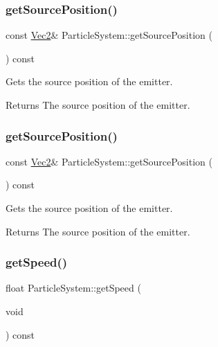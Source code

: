 \subsubsection{\texorpdfstring{get\+Source\+Position()}{getSourcePosition()}\hspace{0.1cm}{\footnotesize\ttfamily [1/2]}}
{\footnotesize\ttfamily const \hyperlink{classVec2}{Vec2}\& Particle\+System\+::get\+Source\+Position (\begin{DoxyParamCaption}{ }\end{DoxyParamCaption}) const\hspace{0.3cm}{\ttfamily [inline]}}

Gets the source position of the emitter.

\begin{DoxyReturn}{Returns}
The source position of the emitter. 
\end{DoxyReturn}
\mbox{\label{classParticleSystem_a61545eb1a87b37e75981c5954b0a9546}} 
\subsubsection{\texorpdfstring{get\+Source\+Position()}{getSourcePosition()}\hspace{0.1cm}{\footnotesize\ttfamily [2/2]}}
{\footnotesize\ttfamily const \hyperlink{classVec2}{Vec2}\& Particle\+System\+::get\+Source\+Position (\begin{DoxyParamCaption}{ }\end{DoxyParamCaption}) const\hspace{0.3cm}{\ttfamily [inline]}}

Gets the source position of the emitter.

\begin{DoxyReturn}{Returns}
The source position of the emitter. 
\end{DoxyReturn}
\mbox{\label{classParticleSystem_a1e67cf5209cc913b92e83fe676685307}} 
\subsubsection{\texorpdfstring{get\+Speed()}{getSpeed()}\hspace{0.1cm}{\footnotesize\ttfamily [1/2]}}
{\footnotesize\ttfamily float Particle\+System\+::get\+Speed (\begin{DoxyParamCaption}\item[{void}]{ }\end{DoxyParamCaption}) const\hspace{0.3cm}{\ttfamily [virtual]}}

